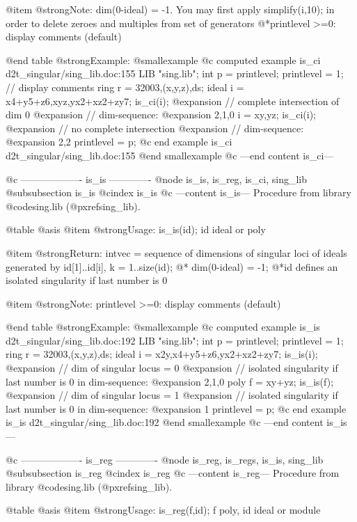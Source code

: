 @item @strong{Note:}
dim(0-ideal) = -1. You may first apply simplify(i,10); in order to
delete zeroes and multiples from set of generators
@*printlevel >=0: display comments (default)

@end table
@strong{Example:}
@smallexample
@c computed example is_ci d2t_singular/sing_lib.doc:155 
LIB "sing.lib";
int p      = printlevel;
printlevel = 1;                // display comments
ring r     = 32003,(x,y,z),ds;
ideal i    = x4+y5+z6,xyz,yx2+xz2+zy7;
is_ci(i);
@expansion{} // complete intersection of dim 0
@expansion{} // dim-sequence:
@expansion{} 2,1,0
i          = xy,yz;
is_ci(i);
@expansion{} // no complete intersection
@expansion{} // dim-sequence:
@expansion{} 2,2
printlevel = p;
@c end example is_ci d2t_singular/sing_lib.doc:155
@end smallexample
@c ---end content is_ci---

@c ------------------- is_is -------------
@node is_is, is_reg, is_ci, sing_lib
@subsubsection is_is
@cindex is_is
@c ---content is_is---
Procedure from library @code{sing.lib} (@pxref{sing_lib}).

@table @asis
@item @strong{Usage:}
is_is(id); id ideal or poly

@item @strong{Return:}
intvec = sequence of dimensions of singular loci of ideals
generated by id[1]..id[i], k = 1..size(id); @*
dim(0-ideal) = -1;
@*id defines an isolated singularity if last number is 0

@item @strong{Note:}
printlevel >=0: display comments (default)

@end table
@strong{Example:}
@smallexample
@c computed example is_is d2t_singular/sing_lib.doc:192 
LIB "sing.lib";
int p      = printlevel;
printlevel = 1;
ring r     = 32003,(x,y,z),ds;
ideal i    = x2y,x4+y5+z6,yx2+xz2+zy7;
is_is(i);
@expansion{} // dim of singular locus = 0
@expansion{} // isolated singularity if last number is 0 in dim-sequence:
@expansion{} 2,1,0
poly f     = xy+yz;
is_is(f);
@expansion{} // dim of singular locus = 1
@expansion{} // isolated singularity if last number is 0 in dim-sequence:
@expansion{} 1
printlevel = p;
@c end example is_is d2t_singular/sing_lib.doc:192
@end smallexample
@c ---end content is_is---

@c ------------------- is_reg -------------
@node is_reg, is_regs, is_is, sing_lib
@subsubsection is_reg
@cindex is_reg
@c ---content is_reg---
Procedure from library @code{sing.lib} (@pxref{sing_lib}).

@table @asis
@item @strong{Usage:}
is_reg(f,id); f poly, id ideal or module

